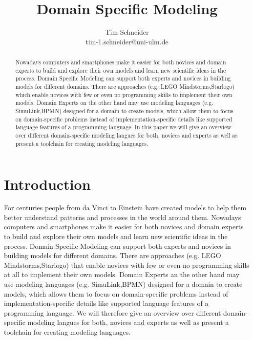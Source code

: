 \documentclass[runningheads,a4paper]{llncs}
\begin{document}
\mainmatter  %

\title{Domain Specific Modeling}



\author{Tim Schneider\\ tim-1.schneider@uni-ulm.de}


\maketitle


\begin{abstract}
Nowadays computers and smartphones make it easier for both novices and domain experts to build 
and explore their own models and learn new scientific ideas in the process.
Domain Specific Modeling can support both experts and novices in building models for different domains.
There are approaches (e.g. LEGO Mindstorms,Starlogo) which enable novices with few or even no programming 
skills to implement their own models.
Domain Experts on the other hand may use modeling languages (e.g. SimuLink,BPMN) designed for a domain to create models, 
which allow them to focus on domain-specific problems instead of implementation-specific details like supported 
language features of a programming language.
In this paper we will give an overview over different domain-specific modeling langues for both, novices and experts
as well as present a toolchain for creating modeling languages. 
\end{abstract}


\section{Introduction}
\label{sec:introduction}
For centuries people from da Vinci to Einstein have created models to help them better 
understand patterns and processes in the world around them. 
Nowadays computers and smartphones make it easier for both novices and domain experts to build 
and explore their own models and learn new scientific ideas in the process.
Domain Specific Modeling can support both experts and novices in building models for different domains.
There are approaches (e.g. LEGO Mindstorms,Starlogo) that enable novices with few or even no programming 
skills at all to implement their own models.
Domain Experts an the other hand may use modeling languages (e.g. SimuLink,BPMN) designed for a domain to create models, 
which allows them to focus on domain-specific problems instead of implementation-specific details like supported 
language features of a programming language.
We will therefore give an overview over different domain-specific modeling langues for both, novices and experts
as well as present a toolchain for creating modeling languages. 
\end{document}

